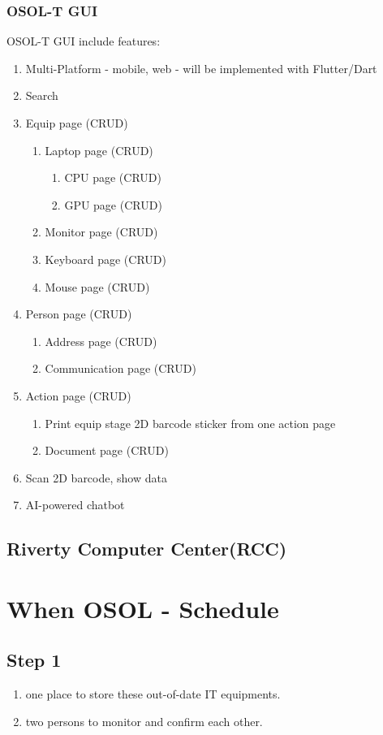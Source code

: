 \documentclass[a4paper,11pt]{article}
\begin{document}
\subsubsection{OSOL-T GUI}
OSOL-T GUI include features:
\begin{enumerate}
	\item Multi-Platform - mobile, web - will be implemented with Flutter/Dart
	\item Search
	\item Equip page (CRUD)
	\begin{enumerate}
		\item Laptop page (CRUD)
		\begin{enumerate}
			\item CPU page (CRUD)
			\item GPU page (CRUD)
		\end{enumerate}
		\item Monitor page (CRUD)
		\item Keyboard page (CRUD)
		\item Mouse page (CRUD)
	\end{enumerate}
	\item Person page (CRUD)
	\begin{enumerate}
		\item Address page (CRUD)
		\item Communication page (CRUD) 
	\end{enumerate}
	\item Action page (CRUD)
	\begin{enumerate}
		\item Print equip stage 2D barcode sticker from one action page
		\item Document page (CRUD)
	\end{enumerate}
	\item Scan 2D barcode, show data
	\item AI-powered chatbot
\end{enumerate}



\subsection{Riverty Computer Center(RCC)}


\section{When OSOL - Schedule}
\subsection{Step 1}
\begin{enumerate}
\item one place to store these out-of-date IT equipments.
\item two persons to monitor and confirm each other.
\end{enumerate}
\end{document}
